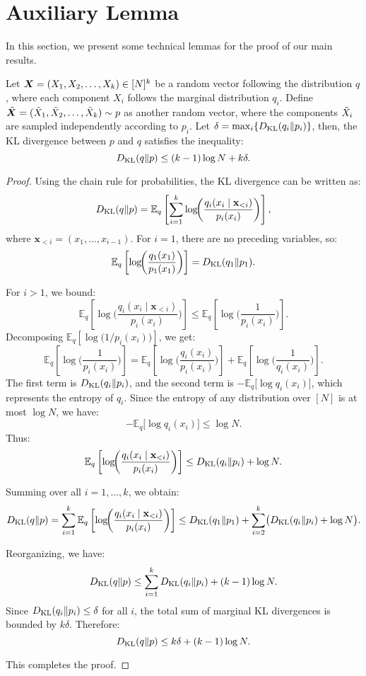 \section{Auxiliary Lemma}
\label{app:lemma}

In this section, we present some technical lemmas for the proof of our main results.
\begin{lemma}
\label{lemma:kl_mul_token_sample}
    Let ${\bm{X}} = (X_1, X_2, \ldots, X_k) \in [N]^k$ be a random vector following the distribution $q$, where each component $X_i$ follows the marginal distribution $q_i$. Define $\Tilde{{\bm{X}}} = (\Tilde{X}_1, \Tilde{X}_2, \ldots, \Tilde{X}_k) \sim p$ as another random vector, where the components $\Tilde{X}_i$ are sampled independently according to $p_i$. Let $\delta=\max_{i}\{D_{\mathrm{KL}}(q_i\|p_i)\}$, then, the KL divergence between $p$ and $q$ satisfies the inequality:
    \[
    D_{\mathrm{KL}}(q\|p) \leq (k-1)\log N+k\delta.
    \]
    
\end{lemma}

\begin{proof}

Using the chain rule for probabilities, the KL divergence can be written as:
\[
D_{\mathrm{KL}}(q\|p) = \mathbb{E}_q\left[\sum_{i=1}^k \log\!\biggl(\frac{q_i(x_i \mid \mathbf{x}_{<i})}{p_i(x_i)}\biggr)\right],
\]
where \(\mathbf{x}_{<i} = (x_1, \ldots, x_{i-1})\). For \(i = 1\), there are no preceding variables, so:
\[
\mathbb{E}_q\left[\log\!\biggl(\frac{q_1(x_1)}{p_1(x_1)}\biggr)\right] = D_{\mathrm{KL}}(q_1\|p_1).
\]

For \(i > 1\), we bound:
\[
\mathbb{E}_q\left[\log\!\biggl(\frac{q_i(x_i \mid \mathbf{x}_{<i})}{p_i(x_i)}\biggr)\right]
\leq \mathbb{E}_q\left[\log\!\biggl(\frac{1}{p_i(x_i)}\biggr)\right].
\]
Decomposing \(\mathbb{E}_q\left[\log\!\bigl(1/p_i(x_i)\bigr)\right]\), we get:
\[
\mathbb{E}_q\left[\log\!\biggl(\frac{1}{p_i(x_i)}\biggr)\right]
= \mathbb{E}_q\left[\log\!\biggl(\frac{q_i(x_i)}{p_i(x_i)}\biggr)\right] + \mathbb{E}_q\left[\log\!\biggl(\frac{1}{q_i(x_i)}\biggr)\right].
\]
The first term is \(D_{\mathrm{KL}}(q_i\|p_i)\), and the second term is \(-\mathbb{E}_q\bigl[\log q_i(x_i)\bigr]\), which represents the entropy of \(q_i\). Since the entropy of any distribution over \([N]\) is at most \(\log N\), we have:
\[
-\mathbb{E}_q\bigl[\log q_i(x_i)\bigr] \leq \log N.
\]
Thus:
\[
\mathbb{E}_q\left[\log\!\biggl(\frac{q_i(x_i \mid \mathbf{x}_{<i})}{p_i(x_i)}\biggr)\right]
\leq D_{\mathrm{KL}}(q_i\|p_i) + \log N.
\]

Summing over all \(i = 1, \ldots, k\), we obtain:
\[
D_{\mathrm{KL}}(q\|p) = \sum_{i=1}^k \mathbb{E}_q\left[\log\!\biggl(\frac{q_i(x_i \mid \mathbf{x}_{<i})}{p_i(x_i)}\biggr)\right]
\leq D_{\mathrm{KL}}(q_1\|p_1) + \sum_{i=2}^k \bigl(D_{\mathrm{KL}}(q_i\|p_i) + \log N\bigr).
\]

Reorganizing, we have:
\[
D_{\mathrm{KL}}(q\|p) \leq \sum_{i=1}^k D_{\mathrm{KL}}(q_i\|p_i) + (k-1)\log N.
\]
Since \(D_{\mathrm{KL}}(q_i\|p_i) \leq \delta\) for all \(i\), the total sum of marginal KL divergences is bounded by \(k\delta\). Therefore:
\[
D_{\mathrm{KL}}(q\|p) \leq k\delta + (k-1)\log N.
\]

This completes the proof. 

\end{proof}

